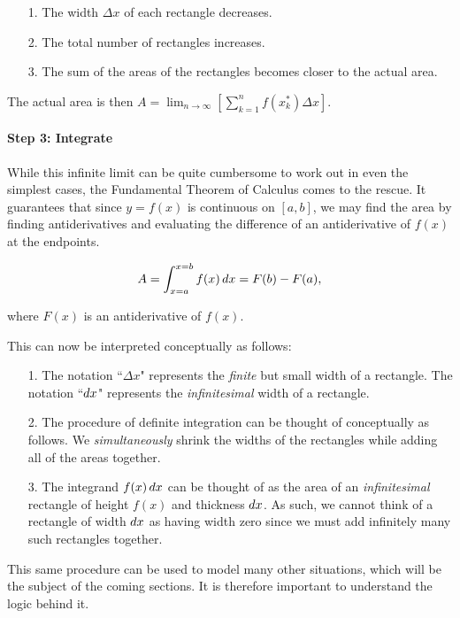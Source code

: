 \documentclass{ximera}
\begin{document}
\begin{itemize}
\item[1.] The width $\Delta x$ of each rectangle decreases.
\item[2.] The total number of rectangles increases.
\item[3.] The sum of the areas of the rectangles becomes closer to the actual area.
\end{itemize}

The actual area is then $A = \lim_{n \rightarrow \infty} \left[ \sum_{k=1}^n f(x_k^*) \Delta x \right]$.


\paragraph{Step 3: Integrate}

While this infinite limit can be quite cumbersome to work out in even the simplest cases, the Fundamental Theorem of Calculus comes to the rescue.  It guarantees that since $y=f(x)$ is continuous on $[a,b]$, we may find the area by finding antiderivatives and evaluating the difference of an antiderivative of $f(x)$ at the endpoints.

\[A = \int_{x=a}^{x=b} f(x) \mathop{}\!d x = F(b)-F(a) ,\]

where $F(x)$ is an antiderivative of $f(x)$.

This can now be interpreted conceptually as follows:
\begin{itemize}
\item[1.] The notation ``$\Delta x$" represents the \emph{finite} but small width of a rectangle.  The notation ``$\mathop{}\!d x$" represents the \emph{infinitesimal} width of a rectangle.
\item[2.] The procedure of definite integration can be thought of conceptually as follows.  We \emph{simultaneously} shrink the widths of the rectangles while adding all of the areas together.  
\item[3.] The integrand $f(x) \mathop{}\!d x$ can be thought of as the area of an \emph{infinitesimal} rectangle of height $f(x)$ and thickness $\mathop{}\!d x$.  As such, we cannot think of a rectangle of width $\mathop{}\!d x$ as having width zero since we must add infinitely many such rectangles together. 
\end{itemize}

This same procedure can be used to model many other situations, which will be the subject of the coming sections.  It is therefore important to understand the logic behind it.
\end{document}
